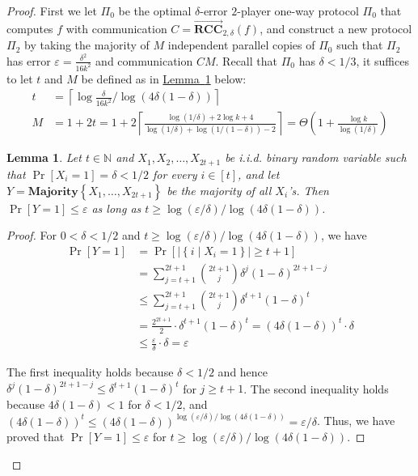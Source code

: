 \documentclass[11pt]{article}
\numberwithin{equation}{section}
\newtheorem{lemma}[theorem]{Lemma}
\theoremstyle{definition}
\theoremstyle{plain}
\newcommand{\N}{\mathbb N}
\newcommand{\expref}[2]{\hyperref[#2]{#1~\ref{#2}}}
\newcommand{\set}[1]{{\left \{{#1} \right \}}}
\newcommand{\st}{\;|\;}
\newcommand{\ceil}[1]{ {\left\lceil{#1} \right\rceil}}
\newcommand{\error}{\ensuremath{\delta}}
\newcommand{\gap}{\ensuremath{\varepsilon}}
\newcommand{\bigtheta}[1]{\ensuremath{{\Theta\left({#1} \right)}}}
\newcommand{\rccone}{\ensuremath{\overrightarrow{\mathbf{RCC}}}}
\begin{document}
\begin{proof}


First we let $\Pi_0$ be the optimal $\error$-error $2$-player one-way protocol $\Pi_0$ that computes $f$ with communication $C=\rccone_{2,\error}(f)$,
and construct a new protocol $\Pi_2$ by taking 
the majority of $M$ independent parallel copies of $\Pi_0$ such that $\Pi_2$ has error $\varepsilon = \frac{\error^2}{16k^2}$ and communication ${C M}$.
Recall that $\Pi_0$ has $\error<1/3$,  it suffices to let $t$ and $M$ be defined as in \expref{Lemma}{lemma:amp} below:
\begin{align}\label{equ:M}
t &= \ceil{\log\frac{\error}{16k^2}/\log\left(4\error(1-\error) \right)}\\
M &=1+2t=1+2\ceil{\frac{\log(1/\error)+2\log k+4}{\log(1/\error)+\log(1/(1-\error))-2}}=\bigtheta{1+\frac{\log k}{\log(1/\error)}}	
\end{align}


\begin{lemma}\label{lemma:amp}
Let $t\in \N$ and $X_1,X_2,\dots, X_{2t+1}$ be i.i.d. binary random variable such that $\Pr[X_i=1]=\error<1/2$ for every $i\in[t]$,
and let $Y=\mathbf{Majority}\set{X_1,\dots, X_{2t+1}}$ be the majority of all $X_i$'s.
Then $\Pr[Y=1]\le \gap$ as long as $t\ge \log(\gap/\error)/\log(4\error(1-\error))$.	
\end{lemma}

\begin{proof}
For $0<\error<1/2$ and $t\ge \log(\gap/\error)/\log(4\error(1-\error))$,
we have 
\begin{align*}
	\Pr\left[ Y=1 \right] &= \Pr\left[ |\set{i\st X_i=1}|\ge t+1 \right]
	\\
	&= \sum_{j=t+1}^{2t+1} \binom{2t+1}{j} \error^j(1-\error)^{2t+1-j}\\
	&\le \sum_{j=t+1}^{2t+1} \binom{2t+1}{j} \error^{t+1}(1-\error)^{t}\\
	&=\frac{2^{2t+1}}{2} \cdot \error^{t+1}(1-\error)^{t}
	=\left( 4\error(1-\error) \right)^t \cdot\error\\
	&\le \frac{\gap}{\error} \cdot\error =\gap
\end{align*}


The first inequality holds because $\error<1/2$ and hence $\error^j(1-\error)^{2t+1-j}\le \error^{t+1}(1-\error)^{t}$ for $j\ge t+1$.	
The second inequality holds because $4\error(1-\error)<1$ for $\error<1/2$, and $\left( 4\error(1-\error) \right)^t\le \left( 4\error(1-\error) \right)^{\log(\gap/\error)/\log(4\error(1-\error))} = \gap/\error$. 
Thus, we have proved that $\Pr[Y=1]\le \gap$ for $t \ge {\log(\gap/\error)/\log(4\error(1-\error))}$.
\end{proof}



\end{proof}
\end{document}
